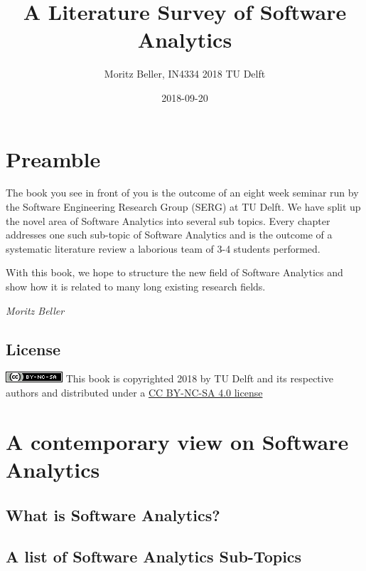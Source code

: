 \documentclass[]{book}
\title{A Literature Survey of Software Analytics}
\author{Moritz Beller, IN4334 2018 TU Delft}
\date{2018-09-20}
\begin{document}
\maketitle

{
\setcounter{tocdepth}{1}
\tableofcontents
}
\chapter{Preamble}\label{intro}

The book you see in front of you is the outcome of an eight week seminar
run by the Software Engineering Research Group (SERG) at TU Delft. We
have split up the novel area of Software Analytics into several sub
topics. Every chapter addresses one such sub-topic of Software Analytics
and is the outcome of a systematic literature review a laborious team of
3-4 students performed.

With this book, we hope to structure the new field of Software Analytics
and show how it is related to many long existing research fields.

\emph{Moritz Beller}

\section{License}\label{license}

\includegraphics{figures/cc-nc-sa.png} This book is copyrighted 2018 by
TU Delft and its respective authors and distributed under a
\href{https://creativecommons.org/licenses/by-nc-sa/4.0/}{CC BY-NC-SA
4.0 license}

\chapter{A contemporary view on Software
Analytics}\label{a-contemporary-view-on-software-analytics}

\section{What is Software Analytics?}\label{what-is-software-analytics}

\section{A list of Software Analytics
Sub-Topics}\label{a-list-of-software-analytics-sub-topics}
\end{document}
